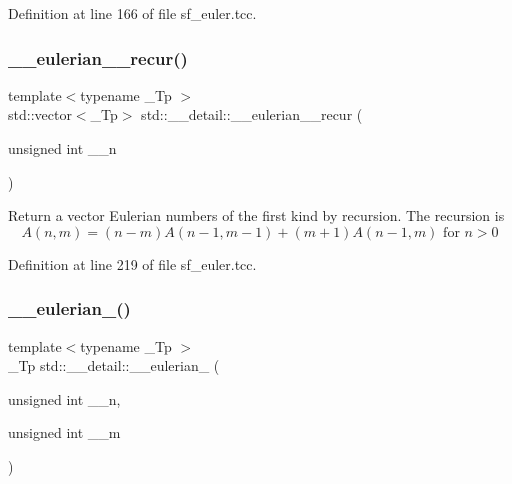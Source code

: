 Definition at line 166 of file sf\+\_\+euler.\+tcc.

\mbox{\label{namespacestd_1_1____detail_acab0c44030d62f8ff1576a33b90aa9e3}} 
\subsubsection{\texorpdfstring{\+\_\+\+\_\+eulerian\+\_\+\_\+recur()}{\_\_eulerian\_1\_recur()}\hspace{0.1cm}{\footnotesize\ttfamily [2/2]}}
{\footnotesize\ttfamily template$<$typename \+\_\+\+Tp $>$ \\
std\+::vector$<$\+\_\+\+Tp$>$ std\+::\+\_\+\+\_\+detail\+::\+\_\+\+\_\+eulerian\+\_\+\_\+recur (\begin{DoxyParamCaption}\item[{unsigned int}]{\+\_\+\+\_\+n }\end{DoxyParamCaption})}

Return a vector Eulerian numbers of the first kind by recursion. The recursion is \[ A(n,m) = (n-m)A(n-1,m-1) + (m+1)A(n-1,m) \mbox{ for } n > 0 \] 

Definition at line 219 of file sf\+\_\+euler.\+tcc.

\mbox{\label{namespacestd_1_1____detail_aa93423478ed5fd1fc260cc30466bef73}} 
\subsubsection{\texorpdfstring{\+\_\+\+\_\+eulerian\+\_()}{\_\_eulerian\_2()}\hspace{0.1cm}{\footnotesize\ttfamily [1/2]}}
{\footnotesize\ttfamily template$<$typename \+\_\+\+Tp $>$ \\
\+\_\+\+Tp std\+::\+\_\+\+\_\+detail\+::\+\_\+\+\_\+eulerian\+\_ (\begin{DoxyParamCaption}\item[{unsigned int}]{\+\_\+\+\_\+n,  }\item[{unsigned int}]{\+\_\+\+\_\+m }\end{DoxyParamCaption})\hspace{0.3cm}{\ttfamily [inline]}}

